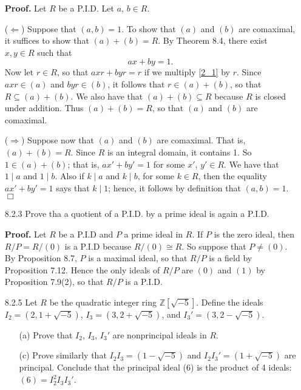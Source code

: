 \documentclass[9pt]{article}
\newcommand{\qed}{\hfill \ensuremath{\Box}}
\newcommand{\Z}{\mathbb{Z}}
\begin{document}
\begin{enumerate}
      \textbf{Proof.} Let $R$ be a P.I.D. Let $a$, $b \in R$.

      ($\Leftarrow$) Suppose that $(a, b) = 1$. To show that $(a)$ and $(b)$ are 
      comaximal, it suffices to show that $(a) + (b) = R$. By Theorem 8.4, there
      exist $x, y \in R$ such that
      \begin{equation} \label{2_1}
         ax + by = 1.
      \end{equation}
      Now let $r \in R$, so that $axr + byr = r$ if we multiply \eqref{2_1} by
      $r$. Since $axr \in (a)$ and $byr \in (b)$, it follows that
      $r \in (a) + (b)$, so that $R \subseteq (a) + (b)$. We also have that
      $(a) + (b) \subseteq R$ because $R$ is closed under addition. Thus
      $(a) + (b) = R$, so that $(a)$ and $(b)$ are comaximal.

      ($\Rightarrow$) Suppose now that $(a)$ and $(b)$ are comaximal. That is,
      $(a) + (b) = R$. Since $R$ is an integral domain, it contains 1. So
      $1 \in (a) + (b)$; that is, $ax' + by' = 1$ for some $x'$, $y' \in R$. We
      have that $1 \mid a$ and $1 \mid b$. Also if $k \mid a$ and $k \mid b$,
      for some $k \in R$, then the equality $ax' + by' = 1$ says that
      $k \mid 1$; hence, it follows by definition that $(a, b) = 1$. \qed
   \item[8.2.3]   Prove tha a quotient of a P.I.D. by a prime ideal is again a
                  P.I.D.

      \textbf{Proof.} Let $R$ be a P.I.D and $P$ a prime ideal in $R$. If $P$ is
      the zero ideal, then $R/P = R/(0)$ is a P.I.D because $R/(0) \cong R$. So
      suppose that $P \neq (0)$. By Proposition 8.7, $P$ is a maximal ideal, so
      that $R/P$ is a field by Proposition 7.12. Hence the only ideals of $R/P$
      are $(0)$ and $(1)$ by Proposition 7.9(2), so that $R/P$ is a P.I.D.
   \item[8.2.5]   Let $R$ be the quadratic integer ring $\Z[\sqrt{-5}]$. Define
                  the ideals $I_2 = (2, 1 + \sqrt{-5})$,
                  $I_3 = (3, 2 + \sqrt{-5})$, and $I_3' = (3, 2 - \sqrt{-5})$.
                  \begin{enumerate}
                     \item[(a)]  Prove that $I_2$, $I_3$, $I_3'$ are
                                 nonprincipal ideals in $R$.
                     \item[(c)]  Prove similarly that $I_2I_3 = (1-\sqrt{-5})$ 
                                 and $I_2I_3' = (1 + \sqrt{-5})$ are principal. 
                                 Conclude that the principal ideal (6) is the 
                                 product of 4 ideals: $(6) = I_2^2I_3I_3'$.
                  \end{enumerate}


\end{enumerate}
\end{document}
